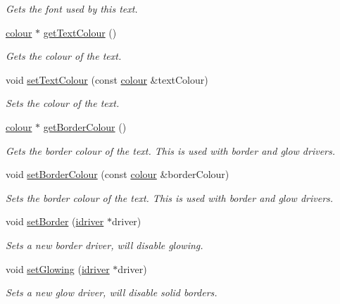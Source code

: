\begin{DoxyCompactItemize}
\begin{DoxyCompactList}\small\item\em Gets the font used by this text. \end{DoxyCompactList}\item 
\hyperlink{classflounder_1_1colour}{colour} $\ast$ \hyperlink{classflounder_1_1text_a583497e298f908f71d7d3982999eccbb}{get\+Text\+Colour} ()
\begin{DoxyCompactList}\small\item\em Gets the colour of the text. \end{DoxyCompactList}\item 
void \hyperlink{classflounder_1_1text_a8048287405568863030770812141f48d}{set\+Text\+Colour} (const \hyperlink{classflounder_1_1colour}{colour} \&text\+Colour)
\begin{DoxyCompactList}\small\item\em Sets the colour of the text. \end{DoxyCompactList}\item 
\hyperlink{classflounder_1_1colour}{colour} $\ast$ \hyperlink{classflounder_1_1text_a9b6ae8abc8233838a5fc164845c87cde}{get\+Border\+Colour} ()
\begin{DoxyCompactList}\small\item\em Gets the border colour of the text. This is used with border and glow drivers. \end{DoxyCompactList}\item 
void \hyperlink{classflounder_1_1text_a6ea3ea5312d5873c1a64cd9b3efc8deb}{set\+Border\+Colour} (const \hyperlink{classflounder_1_1colour}{colour} \&border\+Colour)
\begin{DoxyCompactList}\small\item\em Sets the border colour of the text. This is used with border and glow drivers. \end{DoxyCompactList}\item 
void \hyperlink{classflounder_1_1text_abe7f908c5a19f4994555ceb18e6acd01}{set\+Border} (\hyperlink{classflounder_1_1idriver}{idriver} $\ast$driver)
\begin{DoxyCompactList}\small\item\em Sets a new border driver, will disable glowing. \end{DoxyCompactList}\item 
void \hyperlink{classflounder_1_1text_a09b4a646005f50e7b73e6eed5b0492ad}{set\+Glowing} (\hyperlink{classflounder_1_1idriver}{idriver} $\ast$driver)
\begin{DoxyCompactList}\small\item\em Sets a new glow driver, will disable solid borders. \end{DoxyCompactList}\item 

\end{DoxyCompactItemize}
